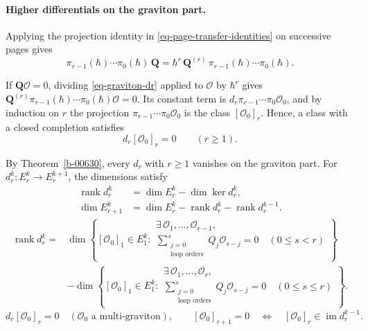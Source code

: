 \documentclass[11pt]{article}
\numberwithin{equation}{section}
\numberwithin{figure}{section}
\numberwithin{table}{section}
\begin{document}
\paragraph{Higher differentials on the graviton part.}\label{sec-graviton-dr}

Applying the projection identity in \eqref{eq-page-transfer-identities} on successive pages gives
\begin{equation}\label{eq-graviton-dr}
\pi_{r-1}(\hbar)\cdots\pi_0(\hbar)\,\mathbf Q
=\hbar^r\,\mathbf Q^{(r)}\,\pi_{r-1}(\hbar)\cdots\pi_0(\hbar).
\end{equation}

If $\mathbf Q\mathcal O=0$, dividing \eqref{eq-graviton-dr} applied to $\mathcal O$ by $\hbar^r$ gives $\mathbf Q^{(r)}\pi_{r-1}(\hbar)\cdots\pi_0(\hbar)\mathcal O=0$. Its constant term is $d_r\pi_{r-1}\cdots\pi_0\mathcal O_0$, and by induction on $r$ the projection $\pi_{r-1}\cdots\pi_0\mathcal O_0$ is the class $[\mathcal O_0]_r$. Hence, a class with a closed completion satisfies
\begin{equation}\label{eq-graviton-dr-zero}
d_r[\mathcal O_0]_r=0\qquad(r\ge1).
\end{equation}

By Theorem~\ref{b-00630}, every $d_r$ with $r\ge1$ vanishes on the graviton part. For $d_r^k:E_r^k\to E_r^{k+1}$, the dimensions satisfy
\begin{equation}\label{local-ch8-page-rank-identity}
\begin{aligned}
\operatorname{rank}d_r^k&=\dim E_r^k-\dim\ker d_r^k,\\
\dim E_{r+1}^k&=\dim E_r^k-\operatorname{rank}d_r^k-\operatorname{rank}d_r^{k-1}.
\end{aligned}
\end{equation}
\begin{equation}\label{local-ff66fcbd-a688-489d-b2a5-4566eb361cd3}
\begin{aligned}
\operatorname{rank}d_r^k
={}&\dim\left\{[\mathcal O_0]_1\in E_1^k:
\begin{array}{l}
\exists\,\mathcal O_1,\ldots,\mathcal O_{r-1},\\
\displaystyle\sum_{\substack{j=0\\\text{loop orders}}}^{s}Q_j\mathcal O_{s-j}=0\quad(0\le s<r)
\end{array}\right\}\\
&-\dim\left\{[\mathcal O_0]_1\in E_1^k:
\begin{array}{l}
\exists\,\mathcal O_1,\ldots,\mathcal O_r,\\
\displaystyle\sum_{\substack{j=0\\\text{loop orders}}}^{s}Q_j\mathcal O_{s-j}=0\quad(0\le s\le r)
\end{array}\right\}.
\end{aligned}
\end{equation}
\begin{equation}\label{sentence-2a40039ce98c2864b4c2c6f7}
d_r[\mathcal O_0]_r=0\quad(\mathcal O_0\text{ a multi-graviton}),
\qquad
[\mathcal O_0]_{r+1}=0
\quad\Longleftrightarrow\quad
[\mathcal O_0]_r\in\operatorname{im}d_r^{k-1}.
\end{equation}
\end{document}
